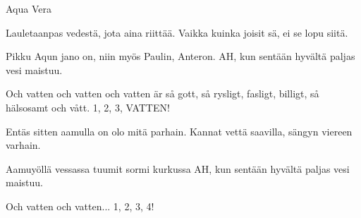 \begin{song}{Aqua Vera}

	Lauletaanpas vedestä,
	jota aina riittää.
	Vaikka kuinka joisit sä,
	ei se lopu siitä.

	Pikku Aqun jano on,
	niin myös Paulin, Anteron.
	AH, kun sentään hyvältä
	paljas vesi maistuu.

	\repetitionbegin{}
	Och vatten och vatten
	och vatten är så gott,
	så rysligt, fasligt, billigt,
	så hälsosamt och vått.
	\repetitionend{}
	1, 2, 3, VATTEN!

	Entäs sitten aamulla
	on olo mitä parhain.
	Kannat vettä saavilla,
	sängyn viereen varhain.

	Aamuyöllä vessassa
	tuumit sormi kurkussa
	AH, kun sentään hyvältä
	paljas vesi maistuu.

	Och vatten och vatten... 1, 2, 3, 4!
\end{song}
